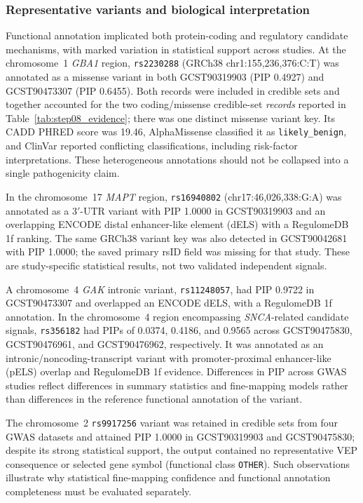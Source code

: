 \documentclass[11pt,a4paper]{article}
\begin{document}
\subsubsection{Representative variants and biological interpretation}

Functional annotation implicated both protein-coding
and regulatory candidate mechanisms, with marked
variation in statistical support across studies.
At the chromosome~1 \textit{GBA1} region,
\texttt{rs2230288} (GRCh38 chr1:155,236,376:C:T)
was annotated as a missense variant in both
GCST90319903 (PIP 0.4927) and GCST90473307
(PIP 0.6455). Both records were included in
credible sets and together accounted for the
two coding/missense credible-set \emph{records}
reported in Table~\ref{tab:step08_evidence};
there was one distinct missense variant key.
Its CADD PHRED score was 19.46, AlphaMissense
classified it as \texttt{likely\_benign}, and
ClinVar reported conflicting classifications,
including risk-factor interpretations. These
heterogeneous annotations should not be collapsed
into a single pathogenicity claim.

In the chromosome~17 \textit{MAPT} region,
\texttt{rs16940802} (chr17:46,026,338:G:A)
was annotated as a 3$'$-UTR variant with
PIP 1.0000 in GCST90319903 and an overlapping
ENCODE distal enhancer-like element (dELS)
with a RegulomeDB 1f ranking. The same
GRCh38 variant key was also detected in
GCST90042681 with PIP 1.0000; the
saved primary rsID field was missing for
that study. These are study-specific statistical
results, not two validated independent signals.

A chromosome~4 \textit{GAK} intronic variant,
\texttt{rs11248057}, had PIP 0.9722 in
GCST90473307 and overlapped an ENCODE dELS,
with a RegulomeDB 1f annotation. In the
chromosome~4 region encompassing
\textit{SNCA}-related candidate signals,
\texttt{rs356182} had PIPs of 0.0374,
0.4186, and 0.9565 across GCST90475830,
GCST90476961, and GCST90476962, respectively.
It was annotated as an intronic/noncoding-transcript
variant with promoter-proximal enhancer-like
(pELS) overlap and RegulomeDB 1f evidence.
Differences in PIP across GWAS studies reflect
differences in summary statistics and fine-mapping
models rather than differences in the reference
functional annotation of the variant.

The chromosome~2 \texttt{rs9917256} variant
was retained in credible sets from four GWAS
datasets and attained PIP 1.0000 in
GCST90319903 and GCST90475830; despite
its strong statistical support, the output
contained no representative VEP consequence or
selected gene symbol (functional class
\texttt{OTHER}). Such observations illustrate why
statistical fine-mapping confidence and functional
annotation completeness must be evaluated separately.
\end{document}
